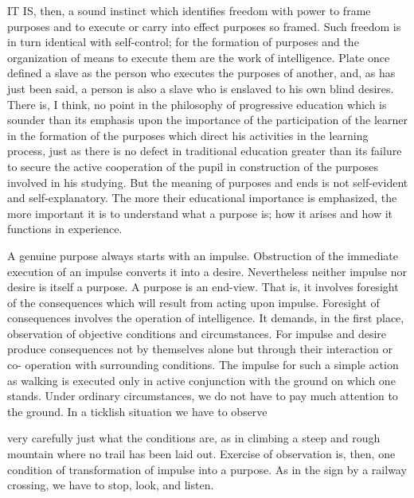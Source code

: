 IT IS, then, a sound instinct which identifies freedom with power to frame purposes 
and to execute or carry into effect purposes so framed. Such freedom is in turn identical 
with self-control; for the formation of purposes and the organization of means to execute 
them are the work of intelligence. Plate once defined a slave as the person who executes 
the purposes of another, and, as has just been said, a person is also a slave who is 
enslaved to his own blind desires. There is, I think, no point in the philosophy of 
progressive education which is sounder than its emphasis upon the importance of the 
participation of the learner in the formation of the purposes which direct his activities in 
the learning process, just as there is no defect in traditional education greater than its 
failure to secure the active cooperation of the pupil in construction of the purposes 
involved in his studying. But the meaning of purposes and ends is not self-evident and 
self-explanatory. The more their educational importance is emphasized, the more 
important it is to understand what a purpose is; how it arises and how it functions in 
experience. 

A genuine purpose always starts with an impulse. Obstruction of the immediate 
execution of an impulse converts it into a desire. Nevertheless neither impulse nor desire 
is itself a purpose. A purpose is an end-view. That is, it involves foresight of the 
consequences which will result from acting upon impulse. Foresight of consequences 
involves the operation of intelligence. It demands, in the first place, observation of 
objective conditions and circumstances. For impulse and desire produce consequences 
not by themselves alone but through their interaction or co- operation with surrounding 
conditions. The impulse for such a simple action as walking is executed only in active 
conjunction with the ground on which one stands. Under ordinary circumstances, we do 
not have to pay much attention to the ground. In a ticklish situation we have to observe 


very carefully just what the conditions are, as in climbing a steep and rough mountain 
where no trail has been laid out. Exercise of observation is, then, one condition of 
transformation of impulse into a purpose. As in the sign by a railway crossing, we have to 
stop, look, and listen. 

